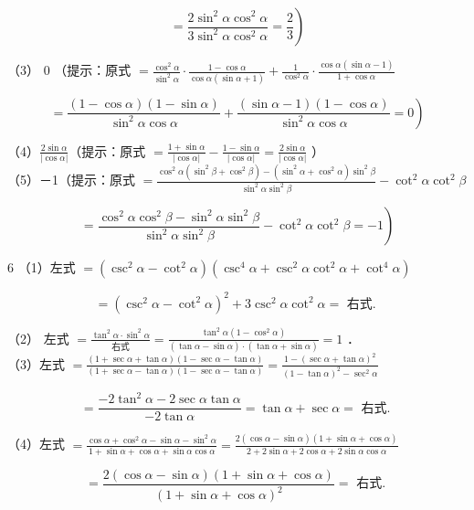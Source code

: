 \documentclass[10pt]{article}
\begin{document}
\[
\left.=\frac{2 \sin ^{2} \alpha \cos ^{2} \alpha}{3 \sin ^{2} \alpha \cos ^{2} \alpha}=\frac{2}{3}\right)
\]

（3） 0 （提示：原式 \(=\frac{\cos ^{2} \alpha}{\sin ^{2} \alpha} \cdot \frac{1-\cos \alpha}{\cos \alpha(\sin \alpha+1)}+\frac{1}{\cos ^{2} \alpha} \cdot \frac{\cos \alpha(\sin \alpha-1)}{1+\cos \alpha}\)

\[
\left.=\frac{(1-\cos \alpha)(1-\sin \alpha)}{\sin ^{2} \alpha \cos \alpha}+\frac{(\sin \alpha-1)(1-\cos \alpha)}{\sin ^{2} \alpha \cos \alpha}=0\right)
\]

（4）\(\frac{2 \sin \alpha}{|\cos \alpha|}\)（提示：原式 \(=\frac{1+\sin \alpha}{|\cos \alpha|}-\frac{1-\sin \alpha}{|\cos \alpha|}=\frac{2 \sin \alpha}{|\cos \alpha|}\) ）\\
（5）－1（提示：原式 \(=\frac{\cos ^{2} \alpha\left(\sin ^{2} \beta+\cos ^{2} \beta\right)-\left(\sin ^{2} \alpha+\cos ^{2} \alpha\right) \sin ^{2} \beta}{\sin ^{2} \alpha \sin ^{2} \beta}-\cot ^{2} \alpha \cot ^{2} \beta\)

\[
\left.=\frac{\cos ^{2} \alpha \cos ^{2} \beta-\sin ^{2} \alpha \sin ^{2} \beta}{\sin ^{2} \alpha \sin ^{2} \beta}-\cot ^{2} \alpha \cot ^{2} \beta=-1\right)
\]

6 （1）左式 \(=\left(\csc ^{2} \alpha-\cot ^{2} \alpha\right)\left(\csc ^{4} \alpha+\csc ^{2} \alpha \cot ^{2} \alpha+\cot ^{4} \alpha\right)\)

\[
=\left(\csc ^{2} \alpha-\cot ^{2} \alpha\right)^{2}+3 \csc ^{2} \alpha \cot ^{2} \alpha=\text { 右式. }
\]

（2） 左式 \(=\frac{\tan ^{2} \alpha \cdot \sin ^{2} \alpha}{\text { 右式 }}=\frac{\tan ^{2} \alpha\left(1-\cos ^{2} \alpha\right)}{(\tan \alpha-\sin \alpha) \cdot(\tan \alpha+\sin \alpha)}=1\) ．\\
（3）左式 \(=\frac{(1+\sec \alpha+\tan \alpha)(1-\sec \alpha-\tan \alpha)}{(1+\sec \alpha-\tan \alpha)(1-\sec \alpha-\tan \alpha)}=\frac{1-(\sec \alpha+\tan \alpha)^{2}}{(1-\tan \alpha)^{2}-\sec ^{2} \alpha}\)

\[
=\frac{-2 \tan ^{2} \alpha-2 \sec \alpha \tan \alpha}{-2 \tan \alpha}=\tan \alpha+\sec \alpha=\text { 右式. }
\]

（4）左式 \(=\frac{\cos \alpha+\cos ^{2} \alpha-\sin \alpha-\sin ^{2} \alpha}{1+\sin \alpha+\cos \alpha+\sin \alpha \cos \alpha}=\frac{2(\cos \alpha-\sin \alpha)(1+\sin \alpha+\cos \alpha)}{2+2 \sin \alpha+2 \cos \alpha+2 \sin \alpha \cos \alpha}\)

\[
=\frac{2(\cos \alpha-\sin \alpha)(1+\sin \alpha+\cos \alpha)}{(1+\sin \alpha+\cos \alpha)^{2}}=\text { 右式. }
\]
\end{document}
